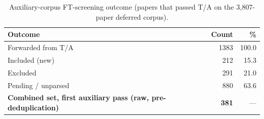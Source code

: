 \begin{table}[htbp]
\centering
\caption{Auxiliary-corpus FT-screening outcome (papers that passed T/A on the 3{,}807-paper deferred corpus).}
\label{tab:aux-ft-screening}
\begin{tabular}{lrr}
\toprule
\textbf{Outcome} & \textbf{Count} & \textbf{\%} \\
\midrule
Forwarded from T/A & 1383 & 100.0 \\
Included (new)     & 212 & 15.3 \\
Excluded            & 291 & 21.0 \\
Pending / unparsed  & 880 & 63.6 \\
\midrule
\textbf{Combined set, first auxiliary pass (raw, pre-deduplication)} & \textbf{381} & --- \\
\bottomrule
\end{tabular}
\end{table}